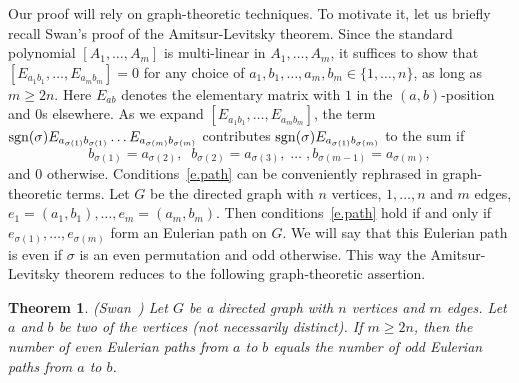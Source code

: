 \documentclass{amsproc}
\newtheorem{theorem}{Theorem}[section]
\theoremstyle{definition}
\theoremstyle{remark}
\numberwithin{equation}{section}
\newcommand{\sgn}{{\rm sgn}}
\begin{document}
Our proof will rely on graph-theoretic techniques. To motivate it, let us briefly recall Swan's proof of the Amitsur-Levitsky theorem. 
Since the standard polynomial $[A_1, \ldots, A_m]$ is multi-linear in $A_1, \ldots, A_m$, it suffices to show that
$[E_{a_1 b_1}, \ldots, E_{a_m b_m}] = 0$ for any choice of $a_1, b_1, \ldots, a_m, b_m \in \{ 1, \ldots, n \}$, as long as $m \geqslant 2n$.
Here $E_{a b}$ denotes the elementary matrix with $1$ in the $(a, b)$-position and $0$s elsewhere. As we expand $[E_{a_1 b_1}, \ldots, E_{a_m b_m}]$,
the term $\sgn(\sigma) E_{a_{\sigma(1)} b_{\sigma(1)}} \ldots E_{a_{\sigma(m)} b_{\sigma(m)}}$ contributes $\sgn(\sigma) E_{a_{\sigma(1)} b_{\sigma(m)}}$
to the sum if 
\begin{equation} \label{e.path} b_{\sigma(1)} = a_{\sigma(2)}, \; \; b_{\sigma(2)} = a_{\sigma(3)}, \; \ldots \; , b_{\sigma(m-1)} = a_{\sigma(m)}, 
\end{equation}
and $0$ otherwise. Conditions~\eqref{e.path} can be conveniently rephrased in graph-theoretic terms. Let $G$ be the directed
graph with $n$ vertices, $1, \ldots, n$ and $m$ edges, $e_1 = (a_{1}, b_1), \ldots, e_m = (a_m, b_m)$. Then conditions~\eqref{e.path} hold if and only if
$e_{\sigma(1)}, \ldots, e_{\sigma(m)}$ form an Eulerian path on $G$. We will say that this Eulerian path is even if $\sigma$ is an even permutation and
odd otherwise. This way the Amitsur-Levitsky theorem reduces to the following graph-theoretic assertion. 

\smallskip
\begin{theorem} {\rm (}Swan~\cite{swan, swan2}{\rm )} \label{thm.swan}
Let $G$ be a directed graph with $n$ vertices and $m$ edges. Let $a$ and $b$ be two of the vertices (not necessarily distinct). If $m \geqslant 2n$,
then the number of even Eulerian paths from $a$ to $b$ equals the number of odd Eulerian paths from $a$ to $b$.
\end{theorem}
\end{document}

